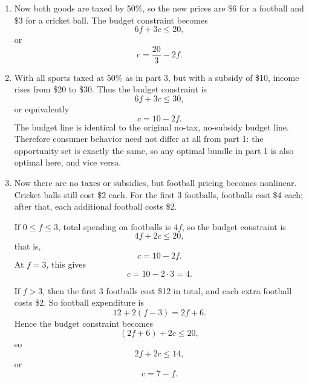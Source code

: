 \documentclass[12pt,a4paper]{article}
\begin{document}
\begin{enumerate}
  \item Now both goods are taxed by 50\%, so the new prices are \$6 for a football and \$3 for a cricket ball. The budget constraint becomes
  \[
    6f+3c\le 20,
  \]
  or
  \[
    c=\frac{20}{3}-2f.
  \]
  \begin{center}
  \end{center}

  \item With all sports taxed at 50\% as in part 3, but with a subsidy of \$10, income rises from \$20 to \$30. Thus the budget constraint is
  \[
    6f+3c\le 30,
  \]
  or equivalently
  \[
    c=10-2f.
  \]
  The budget line is identical to the original no-tax, no-subsidy budget line. Therefore consumer behavior need not differ at all from part 1: the opportunity set is exactly the same, so any optimal bundle in part 1 is also optimal here, and vice versa.

  \item Now there are no taxes or subsidies, but football pricing becomes nonlinear. Cricket balls still cost \$2 each. For the first 3 footballs, footballs cost \$4 each; after that, each additional football costs \$2.

  If $0\le f\le 3$, total spending on footballs is $4f$, so the budget constraint is
  \[
    4f+2c\le 20,
  \]
  that is,
  \[
    c=10-2f.
  \]
  At $f=3$, this gives
  \[
    c=10-2\cdot 3=4.
  \]

  If $f>3$, then the first 3 footballs cost \$12 in total, and each extra football costs \$2. So football expenditure is
  \[
    12+2(f-3)=2f+6.
  \]
  Hence the budget constraint becomes
  \[
    (2f+6)+2c\le 20,
  \]
  so
  \[
    2f+2c\le 14,
  \]
  or
  \[
    c=7-f.
  \]


\end{enumerate}
\end{document}
